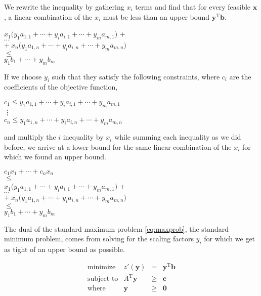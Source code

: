 \documentclass[12pt]{article}
\begin{document}
We rewrite the inequality by gathering $x_i$ terms and find that for every feasible $\mathbf{x}$, a linear combination of the $x_i$ must be less than an upper bound $\mathbf{y}^\text{T}\mathbf{b}$.

\begin{center}
    $x_1 \big(y_1a_{1,1} +  \cdots + y_ia_{i,1} + \cdots +  y_ma_{m,1}\big)$ + \\
    $\cdots$ \\
    $+ \ x_n\big(y_1a_{1,n} + \cdots + y_ia_{i,n} + \cdots +  y_ma_{m,n} \big) $\\
    $ \leq$ \\
    $ y_1b_1  + \cdots +  y_mb_m$ 
\end{center} 

If we choose $y_i$ such that they satisfy the following constraints, where $c_i$ are the coefficients of the objective function,

\begin{center}
	$c_1 \leq y_1a_{1,1} +  \cdots + y_ia_{i,1} + \cdots +  y_ma_{m,1}$ \\
\hspace{0cm} \vdots \\
	$c_n \leq y_1a_{1,n} +  \cdots + y_ia_{i,n} + \cdots +  y_ma_{m,n}$ \\
\end{center}

and multiply the $i$ inequality by $x_i$ while summing each inequality as we did before, we arrive at a lower bound for the same linear combination of the $x_i$ for which we found an upper bound.

\begin{center}
	$ c_1x_1 + \cdots + c_nx_n  $ \\
	$ \leq $\\
    $x_1 \big(y_1a_{1,1} +  \cdots + y_ia_{i,1} + \cdots +  y_ma_{m,1}\big)$ + \\
    $\cdots$ \\
    $+ \ x_n\big(y_1a_{1,n} + \cdots + y_ia_{i,n} + \cdots +  y_ma_{m,n} \big) $\\
    $ \leq$ \\
    $ y_1b_1  + \cdots +  y_mb_m$ 
\end{center} 

The dual of the standard maximum problem \eqref{eq:maxprob}, the standard minimum problem, comes from solving for the scaling factors $y_i$ for which we get as tight of an upper bound as possible.

\begin{equation} \label{eq:minprob}
    \begin{array}{rrcl}
        \text{minimize} & z'(\mathbf{y}) & = & \mathbf{y}^\text{T} \mathbf{b} \\
        \text{subject\ to} & A^\text{T} \mathbf{y} & \geq & \mathbf{c} \\
        \text{where} & \mathbf{y} & \geq & \mathbf{0}
    \end{array}
\end{equation}
\end{document}
